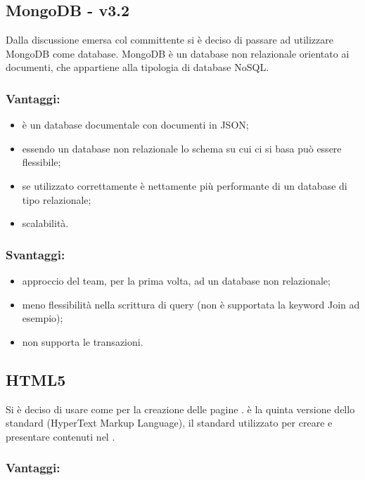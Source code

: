 \documentclass[a4paper, titlepage]{article}
\begin{document}
\subsection{MongoDB - v3.2}
Dalla discussione emersa col committente si è deciso di passare ad utilizzare MongoDB come database. MongoDB è un database non relazionale orientato ai documenti, che appartiene alla tipologia di database NoSQL.

\subsubsection{Vantaggi:}
\begin{itemize}
	\item è un database documentale con documenti in JSON;
	\item essendo un database non relazionale lo schema su cui ci si basa può essere flessibile;
	\item se utilizzato correttamente è nettamente più performante di un database di tipo relazionale;
	\item scalabilità.
\end{itemize}

\subsubsection{Svantaggi:}
\begin{itemize}
	\item approccio del team, per la prima volta, ad un database non relazionale;
	\item meno flessibilità nella scrittura di query (non è supportata la keyword Join ad esempio);
	\item non supporta le transazioni.
\end{itemize}

\subsection{HTML5}
Si è deciso di usare  come  per la creazione delle pagine .  è la quinta versione dello standard  (HyperText Markup Language), il  standard utilizzato per creare e presentare contenuti nel .

\subsubsection{Vantaggi:}
\end{document}
